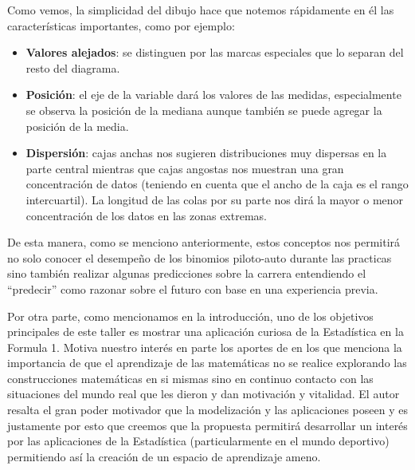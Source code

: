 Como vemos, la simplicidad del dibujo hace que notemos rápidamente  en él las características importantes, como por ejemplo:
\begin{itemize}
	\item \textbf{Valores alejados}: se distinguen por las marcas especiales que lo separan del resto del diagrama. 
	\item \textbf{Posición}: el eje de la variable dará los valores de las medidas, especialmente se observa la posición de la mediana aunque también se puede agregar la posición de la media.
	\item \textbf{Dispersión}: cajas anchas nos sugieren distribuciones muy dispersas en la parte central mientras que cajas angostas nos muestran una gran concentración de datos (teniendo en cuenta que el ancho de la caja es el rango intercuartil). La longitud de las colas por su parte nos dirá la mayor o menor concentración de los datos en las zonas extremas. 
\end{itemize}

De esta manera, como se menciono anteriormente, estos conceptos nos permitirá no solo conocer el desempeño de los binomios piloto-auto durante las practicas sino también realizar algunas predicciones sobre la carrera entendiendo el “predecir” como razonar sobre el futuro
con base en una experiencia previa.

Por otra parte, como mencionamos en la introducción, uno de los objetivos principales de este taller es mostrar una aplicación curiosa de la Estadística en la Formula 1. Motiva nuestro interés en parte los aportes de \textcite{migueldeguzman02} en los que menciona la importancia de que el aprendizaje de las matemáticas no se realice explorando las construcciones matemáticas en si mismas sino en continuo contacto con las situaciones del mundo real que les dieron y dan motivación y vitalidad. El autor resalta el gran poder motivador que la modelización y las aplicaciones poseen y es justamente por esto que creemos que la propuesta permitirá desarrollar un interés por las aplicaciones de la Estadística (particularmente en el mundo deportivo) permitiendo así la creación de un espacio de aprendizaje ameno. 

